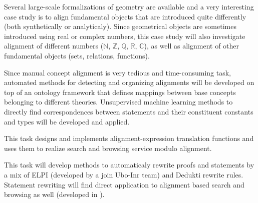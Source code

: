 \begin{workpackage}
\begin{tasklist}
  \begin{task}[id=aligncasestudies,title=Case study: geometry,shorttitle=Case study: geometry,lead=Str,StrRM=18,BelRM=18,wphases=6-42!1]
    Several large-scale formalizations of geometry are available and a
    very interesting case study is to align fundamental objects that
    are introduced quite differently (both synthetically or
    analyticaly). Since geometrical objects are sometimes introduced
    using real or complex numbers, this case study will also
    investigate alignment of different numbers ($\mathbb{N}$,
    $\mathbb{Z}$, $\mathbb{Q}$, $\mathbb{R}$, $\mathbb{C}$), as well
    as alignment of other fundamental objects (sets, relations,
    functions).
  \end{task}

  \begin{task}[id=aligntheories,title=Automated proof engineering,shorttitle=Automated proof engineering,lead=Imt,ImtRM=6,InnRM=6,SacRM=6,wphases=6-24!1]
    Since manual concept alignment is very tedious and time-consuming
    task, automated methods for detecting and organizing alignments
    will be developed on top of an ontology framework that defines
    mappings between base concepts belonging to different
    theories. Unsupervised machine learning methods to directly find
    correspondences between statements and their constituent constants
    and types will be developed and applied.
  \end{task}

  \begin{task}[id=alignsearch,title=Alignment-Based Search,shorttitle=Alignment-Based Search,lead=Fau,FauRM=11,wphases=5-48!.33]
    This task designs and implements alignment-expression translation
    functions and uses them to realize search and browsing service
    modulo alignment.
  \end{task}
  
  \begin{task}[id=alignproofs,title=Proof-Rewriting,shorttitle=Proof-Rewriting,lead=Bol,BolRM=13,InrRM=6,wphases=36-48!1.6]
    This task will develop methods to automaticaly rewrite proofs and
    statements by a mix of ELPI (developed by a join Ubo-Inr team) and
    Dedukti rewrite rules. Statement rewriting will find direct
    application to alignment based search and browsing as well
    (developed in ).
  \end{task}
\end{tasklist}


\end{workpackage}

